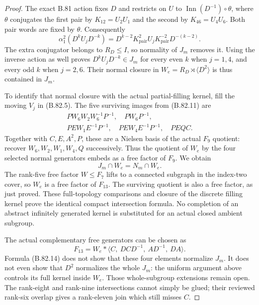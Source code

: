 \begin{proof}
The exact B.81 action fixes \(D\) and restricts on \(U\) to
\(\operatorname{Inn}(D^{-1})\circ\theta\), where \(\theta\)
conjugates the first pair by \(K_{12}=U_2U_1\) and the second by
\(K_{46}=U_4U_6\). Both pair words are fixed by \(\theta\).
Consequently
\[
 \alpha_1^2(D^kU_jD^{-k})
   =D^{k-2}K_{\mathrm{pair}}^2U_jK_{\mathrm{pair}}^{-2}D^{-(k-2)}.
 \tag{B.82.12}
\]
The extra conjugator belongs to \(R_D\le I\), so normality of
\(J_m\) removes it. Using the inverse action as well proves
\(D^kU_jD^{-k}\in J_m\) for every even \(k\) when \(j=1,4\),
and every odd \(k\) when \(j=2,6\). Their normal closure in
\(W_e=R_D\rtimes\langle D^2\rangle\) is thus contained in
\(J_m\).

To identify that normal closure with the actual partial-filling kernel,
fill the moving \(V_j\) in (B.82.5). The five surviving images from
(B.82.11) are
\[
 \begin{gathered}
 PW_6W_2W_6^{-1}P^{-1},\quad PW_6P^{-1},\\
 PEW_1E^{-1}P^{-1},\quad PEW_4E^{-1}P^{-1},\quad PEQC.
 \end{gathered}
 \tag{B.82.13}
\]
Together with \(C,E,A^2,P\), these are a Nielsen basis of the actual
\(F_9\) quotient: recover \(W_6,W_2,W_1,W_4,Q\) successively.
Thus the quotient of \(W_e\) by the four selected normal generators
embeds as a free factor of \(F_9\). We obtain
\[
                       J_m\cap W_e=N_m\cap W_e.
 \tag{B.82.14}
\]
The rank-five free factor \(W\le F_7\) lifts to a connected subgraph
in the index-two cover, so \(W_e\) is a free factor of \(F_{13}\).
The surviving quotient is also a free factor, as just proved. These
full-topology comparisons and closure of the discrete filling kernel
prove the identical compact intersection formula. No completion of an
abstract infinitely generated kernel is substituted for an actual
closed ambient subgroup.

The actual complementary free generators can be chosen as
\[
        F_{13}=W_e*\langle C,\ DCD^{-1},\ AD^{-1},\ DA\rangle.
 \tag{B.82.15}
\]
Formula (B.82.14) does not show that these four elements normalize
\(J_m\). It does not even show that \(D^2\) normalizes the whole
\(J_m\): the uniform argument above controls its full kernel inside
\(W_e\). Those whole-subgroup extensions remain open. The rank-eight
and rank-nine intersections cannot simply be glued; their reviewed
rank-six overlap gives a rank-eleven join which still misses \(C\).


\end{proof}
